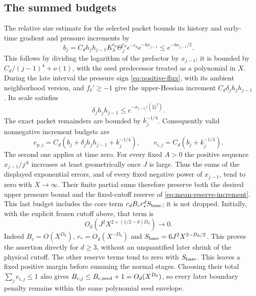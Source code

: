 \subsection{The summed budgets}
The relative size estimate for the selected packet bounds its history
and early-time gradient and pressure increments by
\[
 b_j=C_dh_jh_{j-1}K_h^{c_d}\Theta_j^{c_d}\epsilon^{-c_d}
                         e^{-b x_{j-1}}
       \leq e^{-b x_{j-1}/2}.
\]
This follows by dividing the logarithm of the prefactor by $x_{j-1}$;
it is bounded by $C_d/(j-1)^4+o(1)$, with the seed predecessor treated
as a polynomial in $X$. During the late interval the pressure sign
\eqref{eq:positive-flux}, with its ambient neighborhood version, and
$f_\delta'\geq-1$ give the upper-Hessian increment
$C_d\delta_jh_jh_{j-1}$. Its scale satisfies
\[
 \delta_jh_jh_{j-1}\leq
                  e^{-x_{j-1}/(2j^3)}.
\]
The exact packet remainders are bounded by $k_j^{-1/4}$.
Consequently valid nonnegative increment budgets are
\begin{equation}\label{eq:actual-increment-budgets}
 e_{p,j}=C_d(b_j+\delta_jh_jh_{j-1}+k_j^{-1/4}),\qquad
 e_{i,j}=C_d(b_j+k_j^{-1/4}).
\end{equation}
The second one applies at time zero. For every fixed $A>0$ the positive
sequence $x_{j-1}/j^A$ increases at least geometrically once $J$ is large.
Thus the sums of the displayed exponential errors, and of every fixed
negative power of $x_{j-1}$, tend to zero with $X\to\infty$.
Their finite partial sums therefore preserve both the desired upper
pressure bound and the fixed-cutoff reserve of
\eqref{eq:mean-reserve-increment}. This last budget includes the core
term $c_dB_cr_*^dS_{\rm base}$; it is not dropped.
Initially, with the explicit frozen cutoff above, that term is
\[
 O_d\!\left(J^2X^{2+(1/2-d)D_0}\right)\longrightarrow0.
\]
Indeed $B_c=O(X^{D_0})$, $r_*=O_d(X^{-D_0})$ and
$S_{\rm base}=6J^2X^{2-D_0/2}$. This proves the assertion directly for
$d\ge3$, without an unquantified later shrink of the physical cutoff.
The other reserve terms tend to zero with $S_{\rm base}$.
This leaves a fixed positive margin before summing the normal stages.
Choosing their total $\sum_j e_{i,j}\le1$ also gives
$B_{c,j}\le B_{c,\rm seed}+1=O_d(X^{D_0})$, so every later
boundary penalty remains within the same polynomial seed envelope.

